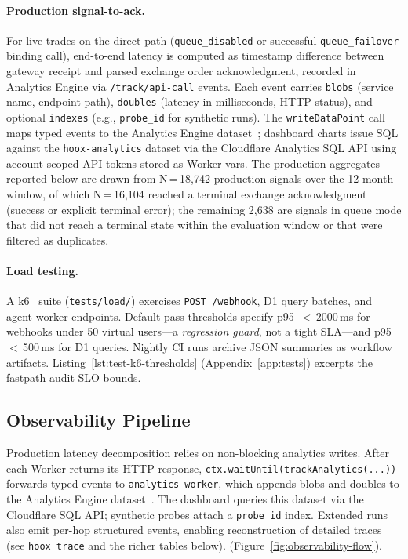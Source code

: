 \paragraph{Production signal-to-ack.} For live trades on the direct path (\texttt{queue\_disabled} or successful \texttt{queue\_failover} binding call), end-to-end latency is computed as timestamp difference between gateway receipt and parsed exchange order acknowledgment, recorded in Analytics Engine via \texttt{/track/api-call} events. Each event carries \texttt{blobs} (service name, endpoint path), \texttt{doubles} (latency in milliseconds, HTTP status), and optional \texttt{indexes} (e.g., \texttt{probe\_id} for synthetic runs). The \texttt{writeDataPoint} call maps typed events to the Analytics Engine dataset~\cite{cloudflare-analytics-engine}; dashboard charts issue SQL against the \texttt{hoox-analytics} dataset via the Cloudflare Analytics SQL API using account-scoped API tokens stored as Worker vars. The production aggregates reported below are drawn from N\,=\,18{,}742 production signals over the 12-month window, of which N\,=\,16{,}104 reached a terminal exchange acknowledgment (success or explicit terminal error); the remaining 2{,}638 are signals in queue mode that did not reach a terminal state within the evaluation window or that were filtered as duplicates.

\paragraph{Load testing.} A k6~\cite{k6-load-testing} suite (\texttt{tests/load/}) exercises \texttt{POST /webhook}, D1 query batches, and agent-worker endpoints. Default pass thresholds specify p95~$<$\,2000\,ms for webhooks under 50 virtual users---a \emph{regression guard}, not a tight SLA---and p95~$<$\,500\,ms for D1 queries. Nightly CI runs archive JSON summaries as workflow artifacts. Listing~\ref{lst:test-k6-thresholds} (Appendix~\ref{app:tests}) excerpts the fastpath audit SLO bounds.

\subsection{Observability Pipeline}

Production latency decomposition relies on non-blocking analytics writes. After each Worker returns its HTTP response, \texttt{ctx.waitUntil(trackAnalytics(...))} forwards typed events to \texttt{analytics-worker}, which appends blobs and doubles to the Analytics Engine dataset~\cite{cloudflare-analytics-engine}. The dashboard queries this dataset via the Cloudflare SQL API; synthetic probes attach a \texttt{probe\_id} index. Extended runs also emit per-hop structured events, enabling reconstruction of detailed traces (see \texttt{hoox trace} and the richer tables below). (Figure~\ref{fig:observability-flow}).

